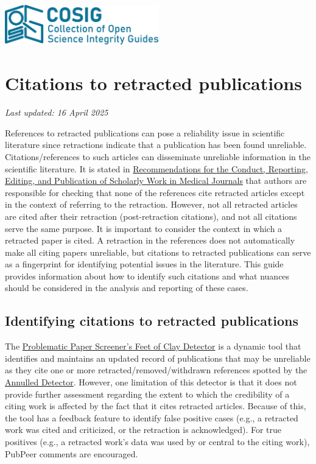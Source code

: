 \documentclass[letterpaper, 12pt]{article}
\begin{document}
\flushleft
\includegraphics[width=0.5\textwidth]{img/home/241017_final_logo_mockup.png}

\section*{Citations to retracted publications}
\textit{Last updated: 16 April 2025}

References to retracted publications can pose a reliability issue in scientific literature since retractions indicate that a publication has been found unreliable. Citations/references to such articles can disseminate unreliable information in the scientific literature. It is stated in \href{https://www.icmje.org/icmje-recommendations.pdf}{Recommendations for the Conduct, Reporting, Editing, and Publication of Scholarly Work in Medical Journals} that authors are responsible for checking that none of the references cite retracted articles except in the context of referring to the retraction. 
However, not all retracted articles are cited after their retraction (post-retraction citations), and not all citations serve the same purpose. It is important to consider the context in which a retracted paper is cited. A retraction in the references does not automatically make all citing papers unreliable, but citations to retracted publications can serve as a fingerprint for identifying potential issues in the literature. This guide provides information about how to identify such citations and what nuances should be considered in the analysis and reporting of these cases. 

\subsection*{Identifying citations to retracted publications}
The \href{https://dbrech.irit.fr/pls/apex/f?p=9999:31}{Problematic Paper Screener’s Feet of Clay Detector} is a dynamic tool that identifies and maintains an updated record of publications that may be unreliable as they cite one or more  retracted/removed/withdrawn references spotted by the \href{https://www.irit.fr/~Guillaume.Cabanac/problematic-paper-screener/annulled}{Annulled Detector}. However, one limitation of this detector is that it does not provide further assessment regarding the extent to which the credibility of a citing work is affected by the fact that it cites retracted articles. Because of this, the tool has a feedback feature to identify false positive cases (e.g., a retracted work was cited and criticized, or the retraction is acknowledged). For true positives (e.g., a retracted work’s data was used by or central to the citing work), PubPeer comments are encouraged. 
\end{document}

